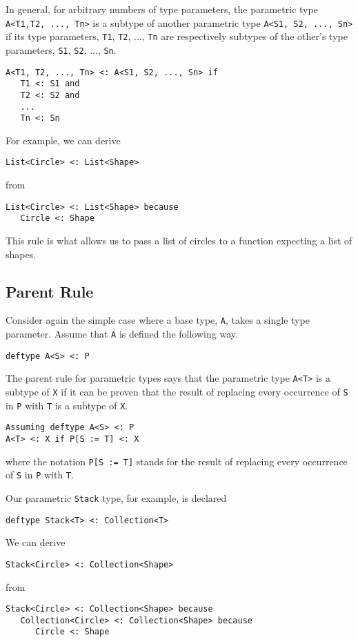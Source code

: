 \documentclass[10pt,oneside]{book}
\begin{document}
In general, for arbitrary numbers of type parameters, the parametric type \texttt{\frenchspacing A<T1,T2, ..., Tn>} is a subtype of another parametric type \texttt{\frenchspacing A<S1, S2, ..., Sn>} if its type parameters, \texttt{\frenchspacing T1}, \texttt{\frenchspacing T2}, ..., \texttt{\frenchspacing Tn} are respectively subtypes of the other's type parameters, \texttt{\frenchspacing S1}, \texttt{\frenchspacing S2}, ..., \texttt{\frenchspacing Sn}.
\begin{lstlisting}
A<T1, T2, ..., Tn> <: A<S1, S2, ..., Sn> if
   T1 <: S1 and
   T2 <: S2 and
   ...
   Tn <: Sn
\end{lstlisting}

For example, we can derive
\begin{lstlisting}
List<Circle> <: List<Shape>
\end{lstlisting}
from
\begin{lstlisting}
List<Circle> <: List<Shape> because
   Circle <: Shape
\end{lstlisting}
This rule is what allows us to pass a list of circles to a function expecting a list of shapes.

\subsection*{Parent Rule}
Consider again the simple case where a base type, \texttt{\frenchspacing A}, takes a single type parameter. Assume that \texttt{\frenchspacing A} is defined the following way.
\begin{lstlisting}
deftype A<S> <: P
\end{lstlisting}
The parent rule for parametric types says that the parametric type \texttt{\frenchspacing A<T>} is a subtype of \texttt{\frenchspacing X} if it can be proven that the result of replacing every occurrence of \texttt{\frenchspacing S} in \texttt{\frenchspacing P} with \texttt{\frenchspacing T} is a subtype of \texttt{\frenchspacing X}.
\begin{lstlisting}
Assuming deftype A<S> <: P
A<T> <: X if P[S := T] <: X
\end{lstlisting}
where the notation \texttt{\frenchspacing P[S := T]} stands for the result of replacing every occurrence of \texttt{\frenchspacing S} in \texttt{\frenchspacing P} with \texttt{\frenchspacing T}.

Our parametric \texttt{\frenchspacing Stack} type, for example, is declared
\begin{lstlisting}
deftype Stack<T> <: Collection<T>
\end{lstlisting}
We can derive
\begin{lstlisting}
Stack<Circle> <: Collection<Shape>
\end{lstlisting}
from
\begin{lstlisting}
Stack<Circle> <: Collection<Shape> because
   Collection<Circle> <: Collection<Shape> because
      Circle <: Shape
\end{lstlisting}
\end{document}

